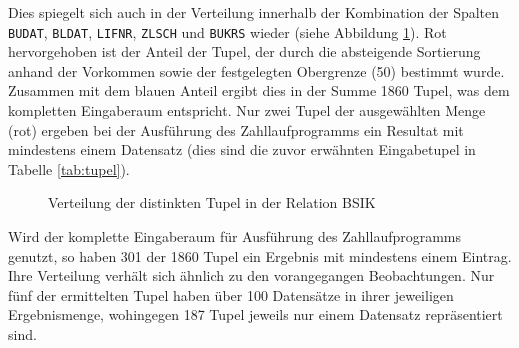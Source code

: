 Dies spiegelt sich auch in der Verteilung innerhalb der Kombination der Spalten \texttt{BUDAT}, \texttt{BLDAT}, \texttt{LIFNR}, \texttt{ZLSCH} und \texttt{BUKRS} wieder (siehe Abbildung \ref{fig:combverteilung}).
Rot hervorgehoben ist der Anteil der Tupel, der durch die absteigende Sortierung anhand der Vorkommen sowie der festgelegten Obergrenze (50) bestimmt wurde.
Zusammen mit dem blauen Anteil ergibt dies in der Summe 1860 Tupel, was dem kompletten Eingaberaum entspricht.
Nur zwei Tupel der ausgewählten Menge (rot) ergeben bei der Ausführung des Zahllaufprogramms ein Resultat mit mindestens einem Datensatz (dies sind die zuvor erwähnten Eingabetupel in Tabelle \ref{tab:tupel}).

\begin{figure}[h]
\centering
	\caption{Verteilung der distinkten Tupel in der Relation BSIK}
	\label{fig:combverteilung}
\end{figure}

Wird der komplette Eingaberaum für Ausführung des Zahllaufprogramms genutzt, so haben 301 der 1860 Tupel ein Ergebnis mit mindestens einem Eintrag.
Ihre Verteilung verhält sich ähnlich zu den vorangegangen Beobachtungen.
Nur fünf der ermittelten Tupel haben über 100 Datensätze in ihrer jeweiligen Ergebnismenge, wohingegen 187 Tupel jeweils nur einem Datensatz repräsentiert sind.
 
